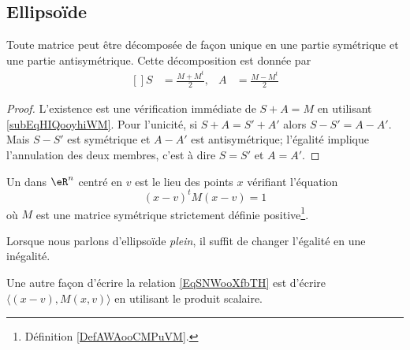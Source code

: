 \subsection{Ellipsoïde}

\begin{lemma}   \label{LemYVWoohcjIX}
    Toute matrice peut être décomposée de façon unique en une partie symétrique et une partie antisymétrique. Cette décomposition est donnée par
\begin{equation}\label{subEqHIQooyhiWM}
    \begin{aligned}[]
            S&=\frac{ M+M^t }{ 2 },&A&=\frac{ M-M^t }{ 2 }
    \end{aligned}
\end{equation}
\end{lemma}

\begin{proof}
    L'existence est une vérification immédiate de \( S+A=M\) en utilisant \eqref{subEqHIQooyhiWM}. Pour l'unicité, si \( S+A=S'+A'\) alors \( S-S'=A-A'\). Mais \( S-S'\) est symétrique et \( A-A'\) est antisymétrique; l'égalité implique l'annulation des deux membres, c'est à dire \( S=S'\) et \( A=A'\).
\end{proof}

\begin{definition}  \label{DefOEPooqfXsE}
    Un  dans \( \eR^n\) centré en \( v\) est le lieu des points \( x\) vérifiant l'équation
    \begin{equation}\label{EqSNWooXfbTH}
        (x-v)^t M(x-v)=1
    \end{equation}
    où \( M\) est une matrice symétrique strictement définie positive\footnote{Définition \ref{DefAWAooCMPuVM}.}.

    Lorsque nous parlons d'ellipsoïde \emph{plein}, il suffit de changer l'égalité en une inégalité.
\end{definition}
Une autre façon d'écrire la relation \eqref{EqSNWooXfbTH} est d'écrire \( \langle (x-v),M(x,v)\rangle\) en utilisant le produit scalaire.

